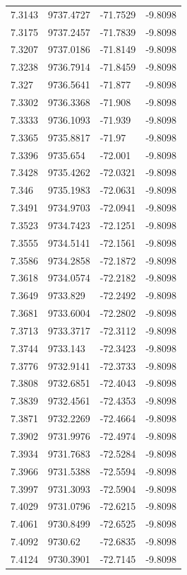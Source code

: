 \begin{table}[H]
\begin{tabular}{llll}
7.3143 & 9737.4727 & -71.7529 & -9.8098 \\
7.3175 & 9737.2457 & -71.7839 & -9.8098 \\
7.3207 & 9737.0186 & -71.8149 & -9.8098 \\
7.3238 & 9736.7914 & -71.8459 & -9.8098 \\
7.327 & 9736.5641 & -71.877 & -9.8098 \\
7.3302 & 9736.3368 & -71.908 & -9.8098 \\
7.3333 & 9736.1093 & -71.939 & -9.8098 \\
7.3365 & 9735.8817 & -71.97 & -9.8098 \\
7.3396 & 9735.654 & -72.001 & -9.8098 \\
7.3428 & 9735.4262 & -72.0321 & -9.8098 \\
7.346 & 9735.1983 & -72.0631 & -9.8098 \\
7.3491 & 9734.9703 & -72.0941 & -9.8098 \\
7.3523 & 9734.7423 & -72.1251 & -9.8098 \\
7.3555 & 9734.5141 & -72.1561 & -9.8098 \\
7.3586 & 9734.2858 & -72.1872 & -9.8098 \\
7.3618 & 9734.0574 & -72.2182 & -9.8098 \\
7.3649 & 9733.829 & -72.2492 & -9.8098 \\
7.3681 & 9733.6004 & -72.2802 & -9.8098 \\
7.3713 & 9733.3717 & -72.3112 & -9.8098 \\
7.3744 & 9733.143 & -72.3423 & -9.8098 \\
7.3776 & 9732.9141 & -72.3733 & -9.8098 \\
7.3808 & 9732.6851 & -72.4043 & -9.8098 \\
7.3839 & 9732.4561 & -72.4353 & -9.8098 \\
7.3871 & 9732.2269 & -72.4664 & -9.8098 \\
7.3902 & 9731.9976 & -72.4974 & -9.8098 \\
7.3934 & 9731.7683 & -72.5284 & -9.8098 \\
7.3966 & 9731.5388 & -72.5594 & -9.8098 \\
7.3997 & 9731.3093 & -72.5904 & -9.8098 \\
7.4029 & 9731.0796 & -72.6215 & -9.8098 \\
7.4061 & 9730.8499 & -72.6525 & -9.8098 \\
7.4092 & 9730.62 & -72.6835 & -9.8098 \\
7.4124 & 9730.3901 & -72.7145 & -9.8098 \\

\end{tabular}
\end{table}
